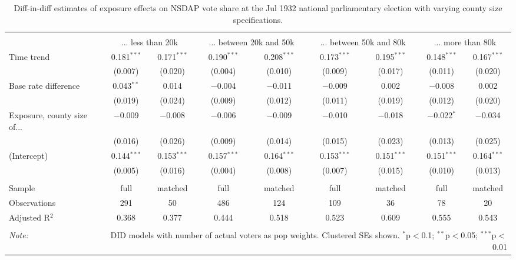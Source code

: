 
\begin{table}[!htbp] \centering 
  \caption{Diff-in-diff estimates of exposure effects on NSDAP vote share at the Jul 1932 national parliamentary election with varying county size specifications.\vspace{-.25cm}} 
  \label{tab:nsdap-voteshare-countysize-dd-1932-1} 
\scriptsize 
\begin{tabular}{@{\extracolsep{5pt}}lcccccccc} 
\\[-1.8ex]\hline 
\hline \\[-1.8ex] 
 & \multicolumn{2}{c}{... less than 20k } & \multicolumn{2}{c}{... between 20k and 50k} & \multicolumn{2}{c}{... between 50k and 80k} & \multicolumn{2}{c}{... more than 80k} \\ 
 \cmidrule(r){2-3}\cmidrule(r){4-5}\cmidrule(r){6-7}\cmidrule(r){8-9}Time trend & 0.181$^{***}$ & 0.171$^{***}$ & 0.190$^{***}$ & 0.208$^{***}$ & 0.173$^{***}$ & 0.195$^{***}$ & 0.148$^{***}$ & 0.167$^{***}$ \\ 
  & (0.007) & (0.020) & (0.004) & (0.010) & (0.009) & (0.017) & (0.011) & (0.020) \\ 
  Base rate difference & 0.043$^{**}$ & 0.014 & $-$0.004 & $-$0.011 & $-$0.009 & 0.002 & $-$0.008 & 0.002 \\ 
  & (0.019) & (0.024) & (0.009) & (0.012) & (0.011) & (0.019) & (0.012) & (0.020) \\ 
  Exposure, county size of... & $-$0.009 & $-$0.008 & $-$0.006 & $-$0.009 & $-$0.010 & $-$0.018 & $-$0.022$^{*}$ & $-$0.034 \\ 
  & (0.016) & (0.026) & (0.009) & (0.014) & (0.015) & (0.023) & (0.013) & (0.025) \\ 
  (Intercept) & 0.144$^{***}$ & 0.153$^{***}$ & 0.157$^{***}$ & 0.164$^{***}$ & 0.153$^{***}$ & 0.151$^{***}$ & 0.151$^{***}$ & 0.164$^{***}$ \\ 
  & (0.005) & (0.016) & (0.004) & (0.008) & (0.007) & (0.015) & (0.010) & (0.013) \\ 
 \hline \\[-1.8ex] 
Sample & full & matched & full & matched & full & matched & full & matched \\ 
Observations & 291 & 50 & 486 & 124 & 109 & 36 & 78 & 20 \\ 
Adjusted R$^{2}$ & 0.368 & 0.377 & 0.444 & 0.518 & 0.523 & 0.609 & 0.555 & 0.543 \\ 
\hline 
\hline \\[-1.8ex] 
\textit{Note:}  & \multicolumn{8}{r}{DID models with number of actual voters as pop weights. Clustered SEs shown. $^{*}$p$<$0.1; $^{**}$p$<$0.05; $^{***}$p$<$0.01} \\ 
\end{tabular} 
\end{table} 
